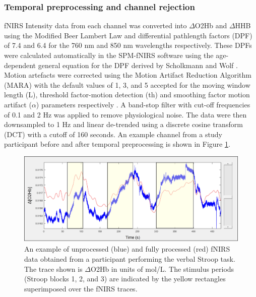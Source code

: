 \documentclass[12pt]{spieman}  %
\begin{document}
\begin{spacing}{2}
\subsubsection{Temporal preprocessing and channel rejection}\label{sec:pipeline}
fNIRS Intensity data from each channel was converted into $\Delta$O2Hb and $\Delta$HHB using the Modified Beer Lambert Law and differential pathlength factors (DPF) of 7.4 and 6.4 for the 760 nm and 850 nm wavelengths respectively. These DPFs were calculated automatically in the SPM-fNIRS software using the age-dependent general equation for the DPF derived by Scholkmann and Wolf \cite{Scholkmann2013}. Motion artefacts were corrected using the Motion Artifact Reduction Algorithm (MARA) with the default values of 1, 3, and 5 accepted for the moving window length (L), threshold factor-motion detection (th) and smoothing factor motion artifact ($\alpha$) parameters respectively \cite{Scholkmann2010a}. A band-stop filter with cut-off frequencies of 0.1 and 2 Hz was applied to remove physiological noise. The data were then downsampled to 1 Hz and linear de-trended using a discrete cosine transform (DCT) with a cutoff of 160 seconds. An example channel from a study participant before and after temporal preprocessing is shown in Figure \ref{fig:temporalPreprocessing}.

\begin{figure}
\begin{center}
\includegraphics[width = \linewidth]{Fig1_temporalPreprocessing_example.jpg}
\end{center}
\caption 
{\label{fig:temporalPreprocessing} An example of unprocessed (blue) and fully processed (red) fNIRS data obtained from a participant performing the verbal Stroop task. The trace shown is $\Delta$O2Hb in units of mol/L. The stimulus periods (Stroop blocks 1, 2, and 3) are indicated by the yellow rectangles superimposed over the fNIRS traces.} 
\end{figure} 


\end{spacing}
\end{document}
